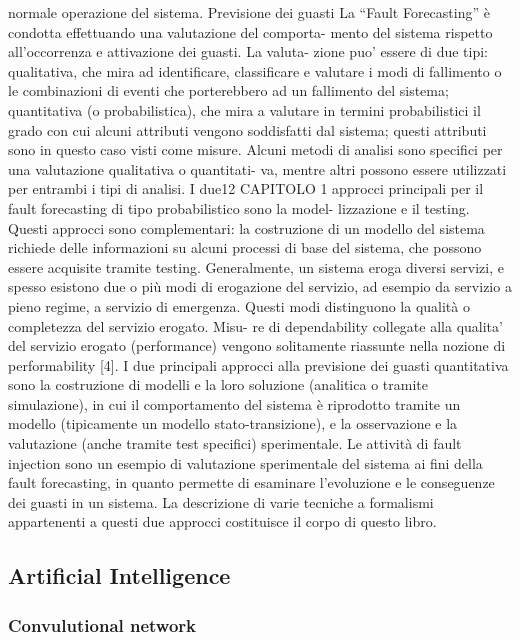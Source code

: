 \documentclass[14pt]{extarticle}
\begin{document}
normale operazione del sistema.
Previsione dei guasti
La “Fault Forecasting” è condotta effettuando una valutazione del comporta-
mento del sistema rispetto all’occorrenza e attivazione dei guasti. La valuta-
zione puo’ essere di due tipi: qualitativa, che mira ad identificare, classificare
e valutare i modi di fallimento o le combinazioni di eventi che porterebbero ad
un fallimento del sistema; quantitativa (o probabilistica), che mira a valutare
in termini probabilistici il grado con cui alcuni attributi vengono soddisfatti
dal sistema; questi attributi sono in questo caso visti come misure. Alcuni
metodi di analisi sono specifici per una valutazione qualitativa o quantitati-
va, mentre altri possono essere utilizzati per entrambi i tipi di analisi. I due12
CAPITOLO 1
approcci principali per il fault forecasting di tipo probabilistico sono la model-
lizzazione e il testing. Questi approcci sono complementari: la costruzione di
un modello del sistema richiede delle informazioni su alcuni processi di base
del sistema, che possono essere acquisite tramite testing. Generalmente, un
sistema eroga diversi servizi, e spesso esistono due o più modi di erogazione
del servizio, ad esempio da servizio a pieno regime, a servizio di emergenza.
Questi modi distinguono la qualità o completezza del servizio erogato. Misu-
re di dependability collegate alla qualita’ del servizio erogato (performance)
vengono solitamente riassunte nella nozione di performability [4].
I due principali approcci alla previsione dei guasti quantitativa sono la
costruzione di modelli e la loro soluzione (analitica o tramite simulazione), in
cui il comportamento del sistema è riprodotto tramite un modello (tipicamente
un modello stato-transizione), e la osservazione e la valutazione (anche tramite
test specifici) sperimentale. Le attività di fault injection sono un esempio di
valutazione sperimentale del sistema ai fini della fault forecasting, in quanto
permette di esaminare l’evoluzione e le conseguenze dei guasti in un sistema.
La descrizione di varie tecniche a formalismi appartenenti a questi due approcci
costituisce il corpo di questo libro.

\subsection{Artificial Intelligence}
\subsubsection{Convulutional network}
\end{document}
